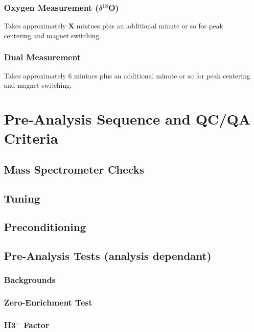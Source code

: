 \documentclass[12pt]{../SOP4_alpha}\usepackage[]{graphicx}\usepackage[]{color}
\begin{document}
\subsubsection{Oxygen Measurement ($\delta$$^{18}$O)}

\NP Takes approximately \textbf{X} mintues plus an additional minute or so for peak centering and magnet switching.

\subsubsection{Dual Measurement}

\NP Takes approximately 6 mintues plus an additional minute or so for peak centering and magnet switching.

\newpage

\section{Pre-Analysis Sequence and QC/QA Criteria}

\subsection{Mass Spectrometer Checks}

\subsection{Tuning}

\subsection{Preconditioning}

\subsection{Pre-Analysis Tests (analysis dependant)}

\subsubsection{Backgrounds}

\subsubsection{Zero-Enrichment Test}

\subsubsection{H3$^+$ Factor}
\end{document}
